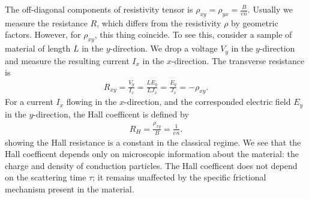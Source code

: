 \documentclass{report}
\begin{document}
The off-diagonal components of resistivity tensor is $\rho_{xy} = \rho_{yx} = \tfrac{B}{en}$. Usually we measure the resistance $R$, which differs from the resistivity $\rho$ by geometric factors. However, for $\rho_{xy}$, this thing coincide. To see this, consider a sample of material of length $L$ in the $y$-direction. We drop a voltage $V_{y}$ in the $y$-direction and measure the resulting current $I_{x}$ in the $x$-direction. The transverse resistance is
\begin{gather}
	R_{xy} = \frac{V_{y}}{I_{x}} = \frac{L E_{y}}{L J_{x}} = \frac{E_{y}}{J_{x}} = -\rho_{xy}.
\end{gather}
For a current $I_{x}$ flowing in the $x$-direction, and the corresponded electric field $E_{y}$ in the $y$-direction, the Hall coefficent is defined by
\begin{gather}
	R_{H} = \frac{\rho_{xy}}{B} = \frac{1}{en} .
\end{gather}
showing the Hall resistance is a constant in the classical regime. We see that the Hall coefficent depends only on microscopic information about the material: the charge and density of conduction particles. The Hall coefficent does not depend on the scattering time $\tau$; it remains unaffected by the specific frictional mechanism present in the material.
\end{document}
